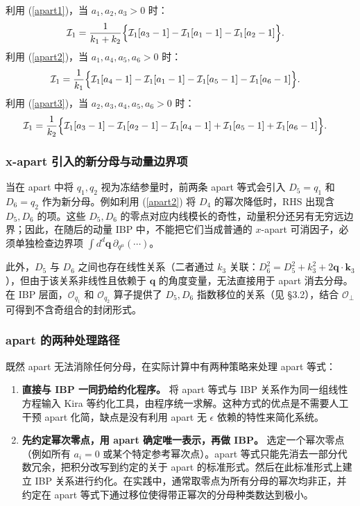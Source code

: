 ﻿\documentclass[a4paper,11pt]{article}
\begin{document}
利用 (\ref{apart1})，当 $a_1,a_2,a_3>0$ 时：
\begin{align}
    \mathcal{I}_1={}&\frac{1}{k_1+k_2}\Bigl\{
        \mathcal{I}_1[a_3-1]-\mathcal{I}_1[a_1-1]-\mathcal{I}_1[a_2-1]\Bigr\}.
\end{align}
利用 (\ref{apart2})，当 $a_1,a_4,a_5,a_6>0$ 时：
\begin{align}
    \mathcal{I}_1={}&\frac{1}{k_1}\Bigl\{
        \mathcal{I}_1[a_4-1]-\mathcal{I}_1[a_1-1]
        -\mathcal{I}_1[a_5-1]-\mathcal{I}_1[a_6-1]\Bigr\}.
\end{align}
利用 (\ref{apart3})，当 $a_2,a_3,a_4,a_5,a_6>0$ 时：
\begin{align}
    \mathcal{I}_1={}&\frac{1}{k_2}\Bigl\{
        \mathcal{I}_1[a_3-1]-\mathcal{I}_1[a_2-1]-\mathcal{I}_1[a_4-1]
        +\mathcal{I}_1[a_5-1]+\mathcal{I}_1[a_6-1]\Bigr\}.
\end{align}

\subsubsection{x-apart 引入的新分母与动量边界项}

当在 apart 中将 $q_1,q_2$ 视为冻结参量时，前两条 apart 等式会引入 $D_5=q_1$ 和 $D_6=q_2$ 作为新分母。例如利用 (\ref{apart2}) 将 $D_4$ 的幂次降低时，RHS 出现含 $D_5,D_6$ 的项。这些 $D_5,D_6$ 的零点对应内线模长的奇性，动量积分还另有无穷远边界；因此，在随后的动量 IBP 中，不能把它们当成普通的 $x$-apart 可消因子，必须单独检查边界项 $\int d^d\boldsymbol{q}\,\partial_{q^\mu}(\cdots)$。

此外，$D_5$ 与 $D_6$ 之间也存在线性关系（二者通过 $k_3$ 关联：$D_6^2 = D_5^2 + k_3^2 + 2\boldsymbol{q}\cdot\boldsymbol{k}_3$），但由于该关系非线性且依赖于 $\boldsymbol{q}$ 的角度变量，无法直接用于 apart 消去分母。在 IBP 层面，$\mathcal{O}_{q_1}$ 和 $\mathcal{O}_{q_2}$ 算子提供了 $D_5,D_6$ 指数移位的关系（见 §3.2），结合 $\mathcal{O}_\perp$ 可得到不含奇组合的封闭形式。

\subsubsection{apart 的两种处理路径}

既然 apart 无法消除任何分母，在实际计算中有两种策略来处理 apart 等式：

\begin{enumerate}
    \item \textbf{直接与 IBP 一同扔给约化程序。} 将 apart 等式与 IBP 关系作为同一组线性方程输入 Kira 等约化工具，由程序统一求解。这种方式的优点是不需要人工干预 apart 化简，缺点是没有利用 apart 无 $\epsilon$ 依赖的特性来简化系统。

    \item \textbf{先约定幂次零点，用 apart 确定唯一表示，再做 IBP。} 选定一个幂次零点（例如所有 $a_i=0$ 或某个特定参考幂次点）。apart 等式只能先消去一部分代数冗余，把积分改写到约定的关于 apart 的标准形式。然后在此标准形式上建立 IBP 关系进行约化。在实践中，通常取零点为所有分母的幂次均非正，并约定在 apart 等式下通过移位使得带正幂次的分母种类数达到极小。
\end{enumerate}
\end{document}
